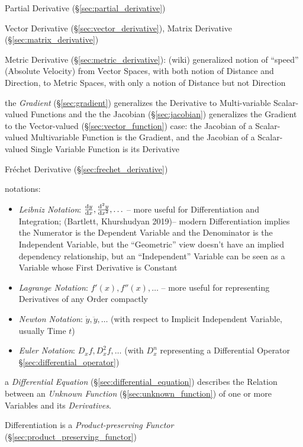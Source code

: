\asterism

\fist Partial Derivative (\S\ref{sec:partial_derivative})

\fist Vector Derivative (\S\ref{sec:vector_derivative}), Matrix Derivative
(\S\ref{sec:matrix_derivative})

\fist Metric Derivative (\S\ref{sec:metric_derivative}): (wiki) generalized
notion of ``speed'' (Absolute Velocity) from Vector Spaces, with both notion of
Distance and Direction, to Metric Spaces, with only a notion of Distance but not
Direction

\fist the \emph{Gradient} (\S\ref{sec:gradient}) generalizes the Derivative to
Multi-variable Scalar-valued Functions and the the Jacobian
(\S\ref{sec:jacobian}) generalizes the Gradient to the Vector-valued
(\S\ref{sec:vector_function}) case: the Jacobian of a Scalar-valued
Multivariable Function is the Gradient, and the Jacobian of a Scalar-valued
Single Variable Function is its Derivative

\fist Fr\'echet Derivative (\S\ref{sec:frechet_derivative})

notations:
\begin{itemize}
  \item \emph{Leibniz Notation}: $\frac{\mathrm{d}y}{\mathrm{d}x}, \frac{\mathrm{d}^2{y}}{\mathrm{d}x^2}, \ldots$
    -- more useful for Differentiation and Integration;
    (Bartlett, Khurshudyan 2019)-- modern Differentiation implies the Numerator
    is the Dependent Variable and the Denominator is the Independent Variable,
    but the ``Geometric'' view doesn't have an implied dependency relationship,
    but an ``Independent'' Variable can be seen as a Variable whose First
    Derivative is Constant
  \item \emph{Lagrange Notation}: $f'(x), f''(x), \ldots$
    -- more useful for representing Derivatives of any Order compactly
  \item \emph{Newton Notation}: $\dot{y}, \ddot{y}, \ldots$ (with respect to
    Implicit Independent Variable, usually Time $t$)
  \item \emph{Euler Notation}: $D_x{f}, D^2_x{f}, \ldots$ (with $D_x^n$
    representing a Differential Operator \S\ref{sec:differential_operator})
\end{itemize}

\fist a \emph{Differential Equation} (\S\ref{sec:differential_equation})
describes the Relation between an \emph{Unknown Function}
(\S\ref{sec:unknown_function}) of one or more Variables and its
\emph{Derivatives}.

Differentiation is a \emph{Product-preserving Functor}
(\S\ref{sec:product_preserving_functor})

